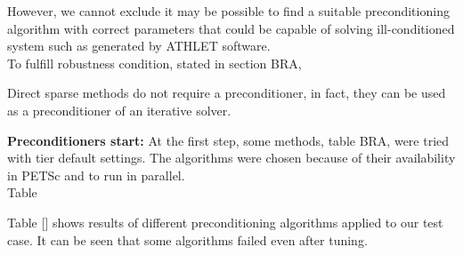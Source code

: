 However, we cannot exclude it may be possible to find a suitable preconditioning algorithm with correct parameters that could be capable of solving ill-conditioned system such as generated by ATHLET software.\\


To fulfill robustness condition, stated in section BRA, 


Direct sparse methods do not require a preconditioner, in fact, they can be used as a preconditioner of an iterative solver.\\








\textbf{Preconditioners start:}
At the first step, some methods, table BRA, were tried with tier default settings. The algorithms were chosen because of their availability in PETSc and to run in parallel.\\





Table 

Table [] shows results of different preconditioning algorithms applied to our test case. It can be seen that some algorithms failed even after tuning. \\

